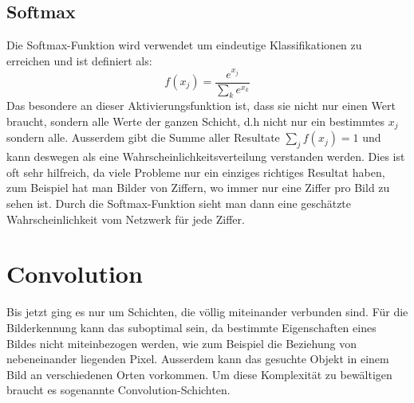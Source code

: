 \documentclass[12pt,a4paper]{report}
\begin{document}
\subsection{Softmax}
Die Softmax-Funktion wird verwendet um eindeutige Klassifikationen zu erreichen und ist definiert als:
\[f(x_j) = \frac{e^{x_j}}{\sum_k{e^{x_k}}}\]
Das besondere an dieser Aktivierungsfunktion ist, dass sie nicht nur einen Wert braucht, sondern alle Werte der ganzen Schicht,
d.h nicht nur ein bestimmtes $x_j$ sondern alle.
Ausserdem gibt die Summe aller Resultate $\sum_j f(x_j) = 1$ und kann deswegen als eine Wahrscheinlichkeitsverteilung verstanden werden.
Dies ist oft sehr hilfreich, da viele Probleme nur ein einziges richtiges Resultat haben, zum Beispiel hat man Bilder von Ziffern,
wo immer nur eine Ziffer pro Bild zu sehen ist.
Durch die Softmax-Funktion sieht man dann eine geschätzte Wahrscheinlichkeit vom Netzwerk für jede Ziffer.
\section{Convolution}
Bis jetzt ging es nur um Schichten, die völlig miteinander verbunden sind.
Für die Bilderkennung kann das suboptimal sein, da bestimmte Eigenschaften eines Bildes nicht miteinbezogen werden,
wie zum Beispiel die Beziehung von nebeneinander liegenden Pixel.
Ausserdem kann das gesuchte Objekt in einem Bild an verschiedenen Orten vorkommen.
Um diese Komplexität zu bewältigen braucht es sogenannte Convolution-Schichten.
\end{document}
